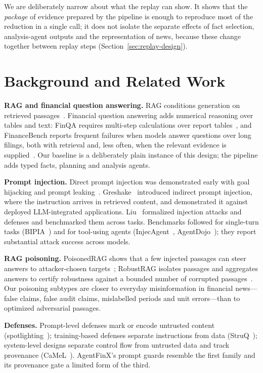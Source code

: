 \documentclass[10pt,letterpaper]{article}
\begin{document}
We are deliberately narrow about what the replay can show. It shows that the \emph{package} of evidence prepared by
the pipeline is enough to reproduce most of the reduction in a single call; it does not isolate the separate effects
of fact selection, analysis-agent outputs and the representation of news, because these change together between
replay steps (Section~\ref{sec:replay-design}).

\section{Background and Related Work}
\textbf{RAG and financial question answering.} RAG conditions generation on retrieved passages~\cite{lewis2020rag}.
Financial question answering adds numerical reasoning over tables and text: FinQA requires multi-step calculations
over report tables~\cite{chen2021finqa}, and FinanceBench reports frequent failures when models answer questions over
long filings, both with retrieval and, less often, when the relevant evidence is supplied~\cite{islam2023financebench}. Our baseline is a deliberately plain instance of
this design; the pipeline adds typed facts, planning and analysis agents.

\textbf{Prompt injection.} Direct prompt injection was demonstrated early with goal hijacking and prompt
leaking~\cite{perez2022ignore}. Greshake~\cite{greshake2023} introduced indirect prompt injection, where the
instruction arrives in retrieved content, and demonstrated it against deployed LLM-integrated applications.
Liu~\cite{liu2024formalizing} formalized injection attacks and defenses and benchmarked them across tasks.
Benchmarks followed for single-turn tasks (BIPIA~\cite{yi2023bipia}) and for tool-using agents
(InjecAgent~\cite{zhan2024injecagent}, AgentDojo~\cite{debenedetti2024agentdojo}); they report substantial attack
success across models.

\textbf{RAG poisoning.} PoisonedRAG shows that a few injected passages can steer answers to attacker-chosen
targets~\cite{zou2025poisonedrag}; RobustRAG isolates passages and aggregates answers to certify robustness against a
bounded number of corrupted passages~\cite{xiang2024robustrag}. Our poisoning subtypes are closer to everyday
misinformation in financial news---false claims, false audit claims, mislabelled periods and unit errors---than to
optimized adversarial passages.

\textbf{Defenses.} Prompt-level defenses mark or encode untrusted content
(spotlighting~\cite{hines2024spotlighting}); training-based defenses separate instructions from data
(StruQ~\cite{chen2025struq}); system-level designs separate control flow from untrusted data and track provenance
(CaMeL~\cite{debenedetti2025camel}). AgentFinX's prompt guards resemble the first family and its provenance gate a
limited form of the third.
\end{document}
